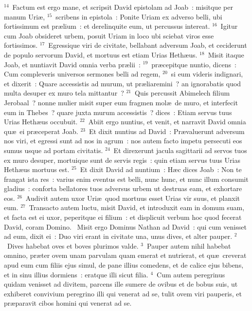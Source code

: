 ${}^{14}$~Factum est ergo mane, et scripsit David epistolam ad Joab~: misitque per manum Uri\ae ,
${}^{15}$~scribens in epistola~: Ponite Uriam ex adverso belli, ubi fortissimum est pr\ae lium~: et derelinquite eum, ut percussus intereat.
${}^{16}$~Igitur cum Joab obsideret urbem, posuit Uriam in loco ubi sciebat viros esse fortissimos.
${}^{17}$~Egressique viri de civitate, bellabant adversum Joab, et ceciderunt de populo servorum David, et mortuus est etiam Urias Heth\ae us.
${}^{18}$~Misit itaque Joab, et nuntiavit David omnia verba pr\ae lii~:
${}^{19}$~pr\ae cepitque nuntio, dicens~: Cum compleveris universos sermones belli ad regem,
${}^{20}$~si eum videris indignari, et dixerit~: Quare accessistis ad murum, ut pr\ae liaremini~? an ignorabatis quod multa desuper ex muro tela mittantur~?
${}^{21}$~Quis percussit Abimelech filium Jerobaal~? nonne mulier misit super eum fragmen mol\ae\ de muro, et interfecit eum in Thebes~? quare juxta murum accessistis~? dices~: Etiam servus tuus Urias Heth\ae us occubuit.
${}^{22}$~Abiit ergo nuntius, et venit, et narravit David omnia qu\ae\ ei pr\ae ceperat Joab.
${}^{23}$~Et dixit nuntius ad David~: Pr\ae valuerunt adversum nos viri, et egressi sunt ad nos in agrum~: nos autem facto impetu persecuti eos sumus usque ad portam civitatis.
${}^{24}$~Et direxerunt jacula sagittarii ad servos tuos ex muro desuper, mortuique sunt de servis regis~: quin etiam servus tuus Urias Heth\ae us mortuus est.
${}^{25}$~Et dixit David ad nuntium~: H\ae c dices Joab~: Non te frangat ista res~: varius enim eventus est belli, nunc hunc, et nunc illum consumit gladius~: conforta bellatores tuos adversus urbem ut destruas eam, et exhortare eos.
${}^{26}$~Audivit autem uxor Uri\ae\ quod mortuus esset Urias vir suus, et planxit eum.
${}^{27}$~Transacto autem luctu, misit David, et introduxit eam in domum suam, et facta est ei uxor, peperitque ei filium~: et displicuit verbum hoc quod fecerat David, coram Domino.
~Misit ergo Dominus Nathan ad David~: qui cum venisset ad eum, dixit ei~: Duo viri erant in civitate una, unus dives, et alter pauper.
${}^{2}$~Dives habebat oves et boves plurimos valde.
${}^{3}$~Pauper autem nihil habebat omnino, pr\ae ter ovem unam parvulam quam emerat et nutrierat, et qu\ae\ creverat apud eum cum filiis ejus simul, de pane illius comedens, et de calice ejus bibens, et in sinu illius dormiens~: eratque illi sicut filia.
${}^{4}$~Cum autem peregrinus quidam venisset ad divitem, parcens ille sumere de ovibus et de bobus suis, ut exhiberet convivium peregrino illi qui venerat ad se, tulit ovem viri pauperis, et pr\ae paravit cibos homini qui venerat ad se.
